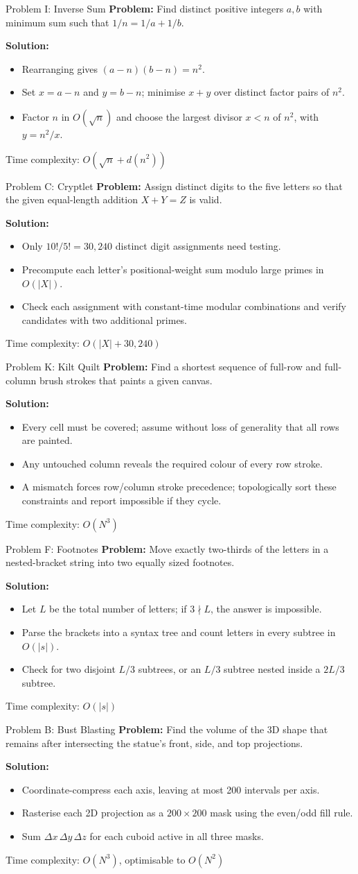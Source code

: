 \documentclass{beamer}
\newcommand{\problemframe}[5]{%
    \begin{frame}{Problem #1: #2}
        \textbf{Problem:} #3\par
        \vspace{0.5em}
        \textbf{Solution:}
        \begin{itemize}
            \setlength{\itemsep}{0.25em}
            #4
        \end{itemize}
        \vfill
        {\small\textcolor{kcpc-muted}{Time complexity: #5}\par}
    \end{frame}
}
\begin{document}
\problemframe{I}{Inverse Sum}
    {Find distinct positive integers $a,b$ with minimum sum such that $1/n=1/a+1/b$.}
    {\item<1-> Rearranging gives $(a-n)(b-n)=n^2$.
     \item<1-> Set $x=a-n$ and $y=b-n$; minimise $x+y$ over distinct factor pairs of $n^2$.
     \item<1-> Factor $n$ in $O(\sqrt n)$ and choose the largest divisor $x<n$ of $n^2$, with $y=n^2/x$.}
    {$O(\sqrt n+d(n^2))$}

\problemframe{C}{Cryptlet}
    {Assign distinct digits to the five letters so that the given equal-length addition $X+Y=Z$ is valid.}
    {\item<1-> Only $10!/5!=30{,}240$ distinct digit assignments need testing.
     \item<1-> Precompute each letter's positional-weight sum modulo large primes in $O(|X|)$.
     \item<1-> Check each assignment with constant-time modular combinations and verify candidates with two additional primes.}
    {$O(|X| + 30{,}240)$}

\problemframe{K}{Kilt Quilt}
    {Find a shortest sequence of full-row and full-column brush strokes that paints a given canvas.}
    {\item<1-> Every cell must be covered; assume without loss of generality that all rows are painted.
     \item<1-> Any untouched column reveals the required colour of every row stroke.
     \item<1-> A mismatch forces row/column stroke precedence; topologically sort these constraints and report impossible if they cycle.}
    {$O(N^3)$}

\problemframe{F}{Footnotes}
    {Move exactly two-thirds of the letters in a nested-bracket string into two equally sized footnotes.}
    {\item<1-> Let $L$ be the total number of letters; if $3\nmid L$, the answer is impossible.
     \item<1-> Parse the brackets into a syntax tree and count letters in every subtree in $O(|s|)$.
     \item<1-> Check for two disjoint $L/3$ subtrees, or an $L/3$ subtree nested inside a $2L/3$ subtree.}
    {$O(|s|)$}

\problemframe{B}{Bust Blasting}
    {Find the volume of the 3D shape that remains after intersecting the statue's front, side, and top projections.}
    {\item<1-> Coordinate-compress each axis, leaving at most 200 intervals per axis.
     \item<1-> Rasterise each 2D projection as a $200\times200$ mask using the even/odd fill rule.
     \item<1-> Sum $\Delta x\,\Delta y\,\Delta z$ for each cuboid active in all three masks.}
    {$O(N^3)$, optimisable to $O(N^2)$}
\end{document}
